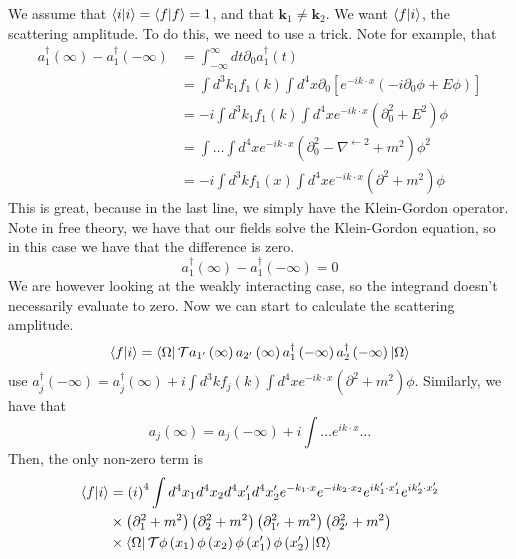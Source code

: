 \documentclass[11pt, oneside]{article}   	%
\theoremstyle{slanted}
\let\vec\mathbf
\begin{document}
We assume that $ \bra{ i }\ket{ i }  = \bra{ f }\ket{ f }  = 1 $, 
and that $ \vec{k} _ 1 \neq \vec{k} _ 2 $. 
We want $ \bra{ f }\ket{ i }  $, the scattering  
amplitude.
To do this, we need to use a 
trick. 
Note for example, that 
\begin{align*}
a _ 1 ^\dagger \left( \infty  \right)   - 
a_ 1 ^\dagger \left(  - \infty  \right)  &=  \int_{ - \infty } ^{ \infty } dt 
\partial  _ 0 a _ 1 ^\dagger \left( t  \right)  \\ 
	 &=  \int d ^ 3 k _ 1  f_ 1 \left( k  \right)  
	 \int d ^ 4 x \partial  _ 0 
	 \left[  e ^{  - i k \cdot  x } 
	 \left(  -i \partial  _ 0 \phi 
 + E \phi \right)  \right]   \\ 
	 &=  - i \int d ^ 3 k _ 1 f _ 1 \left( k  \right)  
	 \int d ^ 4 x e ^{  -i k \cdot  x } 
	 \left(  \partial _ 0 ^ 2 
	 +  E ^ 2 \right) \phi \\ 
	 &=  \int \dots \int d ^ 4 x e ^{  -i k \cdot  x } \left( 
 \partial  _ 0 ^ 2  - \nabla ^{ \leftarrow 2 } 
+ m ^ 2 \right) \phi ^ 2    \\
	 &=   -i \int d ^ 3 k f _ 1 \left( x  \right)  
	 \int d ^ 4 x e ^{  -i k \cdot  x } 
	 \left( \partial  ^2 + m^ 2   \right)  
	 \phi  
\end{align*} 
This is great, because 
in the last line, we simply have the Klein-Gordon operator. 
Note in free theory, we have that 
our fields solve the Klein-Gordon equation, 
so in this case we have that the difference is zero. 
\[
a _ 1 ^\dagger \left( \infty  \right)   - a _ 1 ^\dagger\left(  - \infty  \right)   = 0 
\]
We are however looking at the 
weakly interacting case, so the 
integrand doesn't necessarily evaluate to zero. 
Now we can start to calculate the 
scattering amplitude. 
\[
\bra{ f }\ket{ i }  = 
\bra{ \Omega } \mathcal{ T } a _{ 1 ' } \left( \infty  \right)  
a _{ 2 ' } \left( \infty  \right)  a _{ 1 } ^\dagger \left( - \infty  \right)  
a _ 2 ^\dagger \left( - \infty  \right)  \ket{ \Omega } 
\]  use $ a _ j ^\dagger \left(  - \infty   \right)  = a _ j ^\dagger \left( \infty  \right)   
+ i \int d ^ 3 k f _ j \left( k  \right)  \int d ^ 4 x e ^{  - i k \cdot   x } \left( 
\partial  ^ 2 + m ^ 2 \right)  \phi $. 
Similarly, we have that 
\[
a _ j\left( \infty  \right)   =a _ j \left(  - \infty  \right)  
+ i \int \dots e ^{ i k \cdot   x } \dots 
\] Then, the 
only non-zero term is 
\begin{align*}
\bra{ f }\ket{i } & = \left( i  \right)  ^ 4 
\int d ^ 4 x_ 1 d ^ 4 x _ 2 d ^ 4 x ' _ 1 d ^ 4 x ' _ 2 e ^{ 
- k_ 1 \cdot  x } e ^{  - i k _  2 \cdot  x _ 2 } e ^{ i k _ 1 ' \cdot  x _ 1 ' } 
e ^{ i k _ 2 ' \cdot  x _ 2 '  } \\
& \times \left( \partial  _ 1 ^ 2 + m ^ 2  \right)  \left( \partial  _ 2 ^ 2 
+ m ^ 2 \right)  \left( \partial  _{ 1 ' } ^ 2 + m ^ 2  \right)  \left( 
\partial  _{2 ' } ^ 2 + m ^ 2 \right)  \\
& \times \bra{\Omega } \mathcal{ T } 
\phi \left( x_1  \right)  \phi \left( x_2  \right)  \phi 
\left( x_1 '  \right)  \phi \left( x_2 '   \right) \ket{ \Omega } 
\end{align*}
\end{document}
